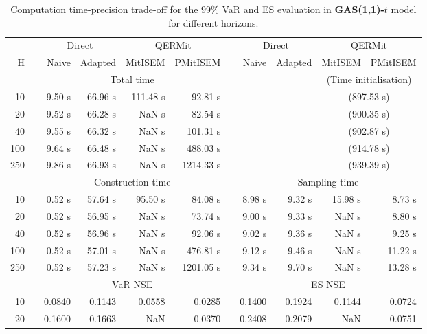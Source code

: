 \footnotesize{  
{ \renewcommand{\arraystretch}{1.3} 
\begin{longtable}{rr rrrr r rrrr}  
\caption{Computation time-precision trade-off for the  $99\%$ VaR and ES evaluation in \textbf{GAS(1,1)-$t$} model for different horizons.} 
\label{tab:time_precision_t_gas} \\ 
 & & \multicolumn{2}{c}{Direct} & \multicolumn{2}{c}{QERMit}&  & \multicolumn{2}{c}{Direct} & \multicolumn{2}{c}{QERMit} \\ \cline{3-6} \cline{8-11} 
 H & & Naive & Adapted & MitISEM & PMitISEM & & Naive & Adapted & MitISEM & PMitISEM \\ \hline 
 & & \multicolumn{4}{c}{Total time} & & && \multicolumn{2}{c}{(Time initialisation)} \\ \cline{3-6} \cline{10-11}
10 & & 9.50 s & 66.96 s & 111.48 s & 92.81 s &&&& \multicolumn{2}{c}{(897.53 s)} \\ 
20 & & 9.52 s & 66.28 s &  NaN s & 82.54 s &&&& \multicolumn{2}{c}{(900.35 s)} \\ 
40 & & 9.55 s & 66.32 s &  NaN s & 101.31 s &&&& \multicolumn{2}{c}{(902.87 s)} \\ 
100 & & 9.64 s & 66.48 s &  NaN s & 488.03 s &&&& \multicolumn{2}{c}{(914.78 s)} \\ 
250 & & 9.86 s & 66.93 s &  NaN s & 1214.33 s &&&& \multicolumn{2}{c}{(939.39 s)} \\ 
\hline 
 & & \multicolumn{4}{c}{Construction time} & & \multicolumn{4}{c}{ Sampling time} \\ \cline{3-6}  \cline{8-11}
10 & & 0.52 s & 57.64 s & 95.50 s & 84.08 s && 8.98 s & 9.32 s & 15.98 s & 8.73 s \\ 
20 & & 0.52 s & 56.95 s &  NaN s & 73.74 s && 9.00 s & 9.33 s &  NaN s & 8.80 s \\ 
40 & & 0.52 s & 56.96 s &  NaN s & 92.06 s && 9.02 s & 9.36 s &  NaN s & 9.25 s \\ 
100 & & 0.52 s & 57.01 s &  NaN s & 476.81 s && 9.12 s & 9.46 s &  NaN s & 11.22 s \\ 
250 & & 0.52 s & 57.23 s &  NaN s & 1201.05 s && 9.34 s & 9.70 s &  NaN s & 13.28 s \\ 
\hline 
 & & \multicolumn{4}{c}{VaR NSE} &&  \multicolumn{4}{c}{ES NSE} \\ \cline{3-6}  \cline{8-11}
10 && 0.0840  & 0.1143  & 0.0558 & 0.0285 && 0.1400  & 0.1924  & 0.1144 & 0.0724 \\ 
20 && 0.1600  & 0.1663  &    NaN & 0.0370 && 0.2408  & 0.2079  &    NaN & 0.0751 \\ 

\end{longtable}}}
